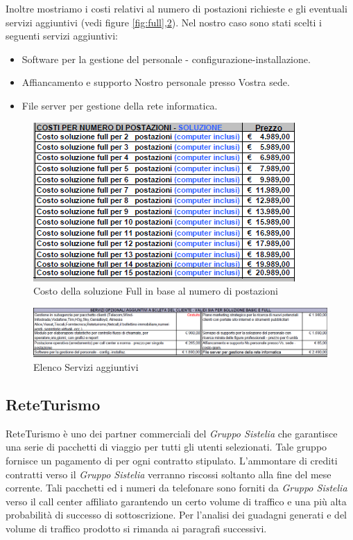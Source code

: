 Inoltre mostriamo i costi relativi al numero di postazioni richieste e gli eventuali servizi aggiuntivi (vedi figure \ref{fig:full},\ref{fig:serviziplus}).
Nel nostro caso sono stati scelti i seguenti servizi aggiuntivi:
\begin{itemize}
\item Software per la gestione del personale - configurazione-installazione.
\item Affiancamento e supporto Nostro personale presso Vostra sede.
\item File server per gestione della rete informatica.
\end{itemize}
\begin{figure}[htbp]
\centering
\includegraphics[scale=0.9]{immagini/Postazioni.png}
\caption{Costo della soluzione Full in base al numero di postazioni \label{fig:postazioni}}
\end{figure}
\begin{figure}[htbp]
\centering
\includegraphics[width=1.15\textwidth,center]{immagini/serviziplus.png}
\caption{Elenco Servizi aggiuntivi  \label{fig:serviziplus}}
\end{figure}


\subsection[ReteTurismo]{ReteTurismo}
ReteTurismo è uno dei partner commerciali del \textit{Gruppo Sistelia} che garantisce una serie di pacchetti di viaggio per tutti gli utenti selezionati. Tale gruppo fornisce un pagamento di  per ogni contratto stipulato.
L'ammontare di crediti contratti verso il \textit{Gruppo Sistelia} verranno riscossi soltanto alla fine del mese corrente.
Tali pacchetti ed i numeri da telefonare sono forniti da \textit{Gruppo Sistelia} verso il call center affiliato garantendo un certo volume di traffico e una più alta probabilità di successo di sottoscrizione.
Per l'analisi dei guadagni generati e del volume di traffico prodotto si rimanda ai paragrafi successivi.